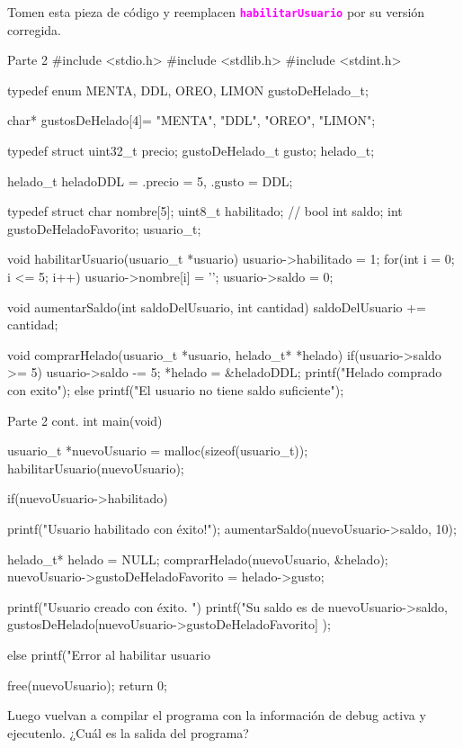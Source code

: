 \documentclass[]{scrartcl}
\newcommand{\hl}[1]{\textcolor{magenta}{\textbf{\texttt{#1}}}}
\begin{document}
Tomen esta pieza de código y reemplacen \hl{habilitarUsuario} por su versión corregida.
\begin{cbox}[]{Parte 2}
#include <stdio.h>
#include <stdlib.h>
#include <stdint.h>

typedef enum{
    MENTA,
    DDL,
    OREO,
    LIMON
} gustoDeHelado_t;

char* gustosDeHelado[4]= {"MENTA", "DDL", "OREO", "LIMON"};

typedef struct{
    uint32_t precio;
    gustoDeHelado_t gusto;
} helado_t;

helado_t heladoDDL = {.precio = 5, .gusto = DDL}; 

typedef struct{
    char nombre[5];
    uint8_t habilitado; // bool
    int saldo;
    int gustoDeHeladoFavorito;
} usuario_t;

void habilitarUsuario(usuario_t *usuario){
    usuario->habilitado = 1;
    for(int i = 0; i <= 5; i++){
        usuario->nombre[i] = '\0';
    }
    usuario->saldo = 0;
}

void aumentarSaldo(int saldoDelUsuario, int cantidad){
    saldoDelUsuario += cantidad;
}

void comprarHelado(usuario_t *usuario, helado_t* *helado){
    if(usuario->saldo >= 5){
        usuario->saldo -= 5;
        *helado = &heladoDDL;
        printf("Helado comprado con exito\n");
    }else{
        printf("El usuario no tiene saldo suficiente\n");
    }
}
\end{cbox}
\begin{cbox}[]{Parte 2 cont.}
int main(void){
    usuario_t *nuevoUsuario = malloc(sizeof(usuario_t));
    habilitarUsuario(nuevoUsuario);
 
    if(nuevoUsuario->habilitado){
        printf("Usuario habilitado con éxito!\n");
        aumentarSaldo(nuevoUsuario->saldo, 10);

        helado_t* helado = NULL;
        comprarHelado(nuevoUsuario, &helado);
        nuevoUsuario->gustoDeHeladoFavorito = helado->gusto;
      
        printf("Usuario creado con éxito. \n")
        printf("Su saldo es de %
               nuevoUsuario->saldo, 
               gustosDeHelado[nuevoUsuario->gustoDeHeladoFavorito]
        );
    } else{
        printf("Error al habilitar usuario %
    }
  
    free(nuevoUsuario);
    return 0;
}
\end{cbox}

Luego vuelvan a compilar el programa con la información de debug activa y ejecutenlo. ¿Cuál es la salida del programa?
\end{document}
